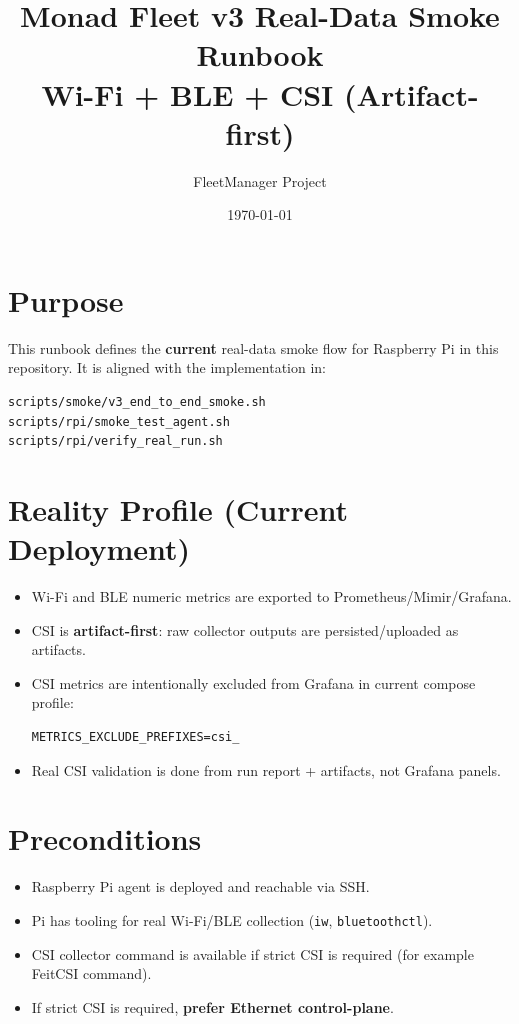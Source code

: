 \documentclass[11pt,a4paper]{article}
\title{Monad Fleet v3 Real-Data Smoke Runbook\\Wi-Fi + BLE + CSI (Artifact-first)}
\author{FleetManager Project}
\date{\today}
\begin{document}
\maketitle

\section{Purpose}
This runbook defines the \textbf{current} real-data smoke flow for Raspberry Pi in this repository.
It is aligned with the implementation in:
\begin{verbatim}
scripts/smoke/v3_end_to_end_smoke.sh
scripts/rpi/smoke_test_agent.sh
scripts/rpi/verify_real_run.sh
\end{verbatim}

\section{Reality Profile (Current Deployment)}
\begin{itemize}
  \item Wi-Fi and BLE numeric metrics are exported to Prometheus/Mimir/Grafana.
  \item CSI is \textbf{artifact-first}: raw collector outputs are persisted/uploaded as artifacts.
  \item CSI metrics are intentionally excluded from Grafana in current compose profile:
\begin{verbatim}
METRICS_EXCLUDE_PREFIXES=csi_
\end{verbatim}
  \item Real CSI validation is done from run report + artifacts, not Grafana panels.
\end{itemize}

\section{Preconditions}
\begin{itemize}
  \item Raspberry Pi agent is deployed and reachable via SSH.
  \item Pi has tooling for real Wi-Fi/BLE collection (\texttt{iw}, \texttt{bluetoothctl}).
  \item CSI collector command is available if strict CSI is required (for example FeitCSI command).
  \item If strict CSI is required, \textbf{prefer Ethernet control-plane}.
\end{itemize}
\end{document}
